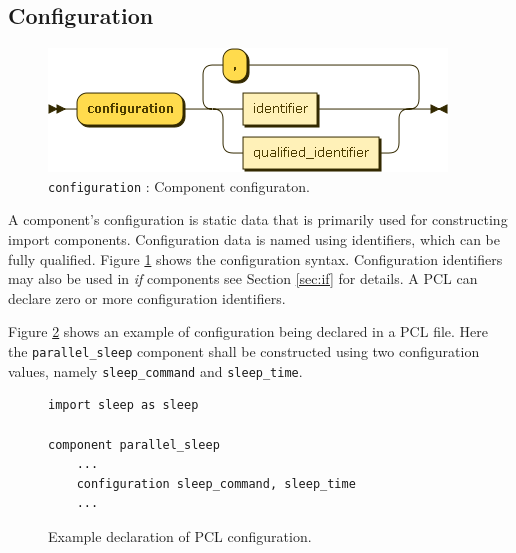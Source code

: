 \subsection{Configuration}
\begin{figure}[h!]
  \centering
    \includegraphics[scale=\DiagramScale]{chapters/compiler/diagrams/configuration}
  \caption{\texttt{configuration} : Component configuraton.}
  \label{fig:pcl-config}
\end{figure}
A component's configuration is static data that is primarily used for constructing import components. Configuration data is named using identifiers, which can be fully qualified. Figure \ref{fig:pcl-config} shows the configuration syntax. Configuration identifiers may also be used in \emph{if} components see Section \ref{sec:if} for details. A PCL can declare zero or more configuration identifiers.

Figure \ref{fig:pcl-config-example} shows an example of configuration being declared in a PCL file. Here the \texttt{parallel\_sleep} component shall be constructed using two configuration values, namely \texttt{sleep\_command} and \texttt{sleep\_time}.
\begin{figure}[h!]
\begin{center}
\begin{verbatim}
import sleep as sleep

component parallel_sleep
    ...
    configuration sleep_command, sleep_time
    ...
\end{verbatim}
\end{center}
\caption{Example declaration of PCL configuration.}
\label{fig:pcl-config-example}
\end{figure}

